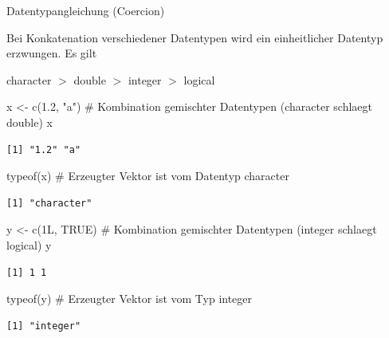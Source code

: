 \documentclass[
  8pt,
  ignorenonframetext,
]{beamer}
\newenvironment{Shaded}{\begin{snugshade}}{\end{snugshade}}
\newcommand{\CommentTok}[1]{\textcolor[rgb]{0.37,0.37,0.37}{#1}}
\newcommand{\ConstantTok}[1]{\textcolor[rgb]{0.56,0.35,0.01}{#1}}
\newcommand{\FloatTok}[1]{\textcolor[rgb]{0.68,0.00,0.00}{#1}}
\newcommand{\FunctionTok}[1]{\textcolor[rgb]{0.28,0.35,0.67}{#1}}
\newcommand{\NormalTok}[1]{\textcolor[rgb]{0.00,0.23,0.31}{#1}}
\newcommand{\OtherTok}[1]{\textcolor[rgb]{0.00,0.23,0.31}{#1}}
\newcommand{\StringTok}[1]{\textcolor[rgb]{0.13,0.47,0.30}{#1}}
\begin{document}
\begin{frame}[fragile]{Datentypangleichung (Coercion)}
\protect\hypertarget{datentypangleichung-coercion}{}
\vspace{2mm}

\small

Bei Konkatenation verschiedener Datentypen wird ein einheitlicher
Datentyp erzwungen. Es gilt

\center

character \(>\) double \(>\) integer \(>\) logical \vspace{2mm}

\justifying
\footnotesize
\vspace{3mm}

\begin{Shaded}
\begin{Highlighting}[]
\NormalTok{x }\OtherTok{\textless{}{-}} \FunctionTok{c}\NormalTok{(}\FloatTok{1.2}\NormalTok{, }\StringTok{"a"}\NormalTok{)     }\CommentTok{\# Kombination gemischter Datentypen (character schlaegt double)}
\NormalTok{x}
\end{Highlighting}
\end{Shaded}

\begin{verbatim}
[1] "1.2" "a"  
\end{verbatim}

\begin{Shaded}
\begin{Highlighting}[]
\FunctionTok{typeof}\NormalTok{(x)            }\CommentTok{\# Erzeugter Vektor ist vom Datentyp character}
\end{Highlighting}
\end{Shaded}

\begin{verbatim}
[1] "character"
\end{verbatim}

\vspace{2mm}

\begin{Shaded}
\begin{Highlighting}[]
\NormalTok{y }\OtherTok{\textless{}{-}} \FunctionTok{c}\NormalTok{(1L, }\ConstantTok{TRUE}\NormalTok{)     }\CommentTok{\# Kombination  gemischter Datentypen (integer schlaegt logical)}
\NormalTok{y}
\end{Highlighting}
\end{Shaded}

\begin{verbatim}
[1] 1 1
\end{verbatim}

\begin{Shaded}
\begin{Highlighting}[]
\FunctionTok{typeof}\NormalTok{(y)            }\CommentTok{\# Erzeugter Vektor ist vom Typ integer}
\end{Highlighting}
\end{Shaded}

\begin{verbatim}
[1] "integer"
\end{verbatim}

\vfill
\end{frame}
\end{document}
